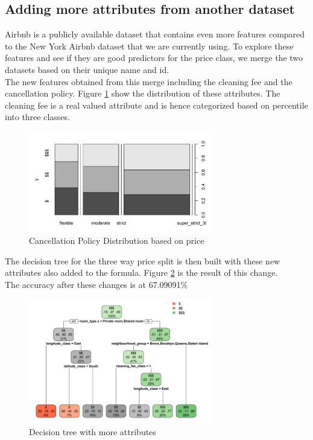 \documentclass{sig-alternate}
\begin{document}
	\subsection{Adding more attributes from another dataset}
	Airbnb is a publicly available dataset that contains even more features compared to the New York Airbnb dataset that we are currently using. To explore these features and see if they are good predictors for the price class, we merge the two datasets based on their unique name and id. \\
	The new features obtained from this merge including the cleaning fee and the cancellation policy. Figure \ref{cancellation} show the distribution of these attributes. 
	The cleaning fee is a real valued attribute and is hence categorized based on percentile into three classes.\\
	\begin{figure}[ht]
		\includegraphics[width=8cm]{cancellation.PNG}
		\caption{Cancellation Policy Distribution based on price}
		\label{cancellation}
		\centering
	\end{figure}
	The decision tree for the three way price split is then built with these new attributes also added to the formula. Figure \ref{decision5} is the result of this change.\\
	The accuracy after these changes is at 67.09091\%
	\begin{figure}[ht]
		\includegraphics[width=8cm]{decision5.PNG}
		\caption{Decision tree with more attributes}
		\label{decision5}
		\centering
	\end{figure}
\end{document}
